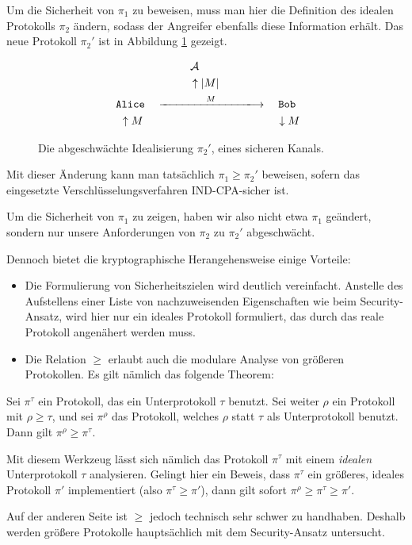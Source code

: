 Um die Sicherheit von $\pi_1$ zu beweisen, muss man hier die Definition des idealen Protokolls $\pi_2$ ändern, sodass der Angreifer ebenfalls diese Information erhält. Das neue Protokoll $\pi_2'$ ist in Abbildung \ref{fig:protocols:weaksecurechannel} gezeigt.

\begin{figure}[hbtp]
	\begin{gather*}
		\advA\quad\quad\\
		\uparrow|M|\\
		\texttt{Alice}\quad
		\xlongrightarrow{\qquad\qquad M\qquad\qquad}
		\quad\texttt{Bob}\\
		\quad\uparrow M\qquad\qquad\qquad\qquad\qquad\qquad\downarrow M
    \end{gather*}
    \caption{Die abgeschwächte Idealisierung $\pi_2'$, eines sicheren Kanals.}
    \label{fig:protocols:weaksecurechannel}
\end{figure}

Mit dieser Änderung kann man tatsächlich $\pi_1 \geq \pi_2'$ beweisen, sofern das eingesetzte Verschlüsselungsverfahren IND-CPA-sicher ist.

Um die Sicherheit von $\pi_1$ zu zeigen, haben wir also nicht etwa $\pi_1$ geändert, sondern nur unsere Anforderungen von $\pi_2$ zu $\pi_2'$ abgeschwächt.

Dennoch bietet die kryptographische Herangehensweise einige Vorteile:
\begin{itemize}
	\item Die Formulierung von Sicherheitszielen wird deutlich vereinfacht.
	Anstelle des Aufstellens einer Liste von nachzuweisenden Eigenschaften wie beim Security-Ansatz, wird hier nur ein ideales Protokoll formuliert, das durch das reale Protokoll angenähert werden muss.
	\item Die Relation $\geq$ erlaubt auch die modulare Analyse von größeren Protokollen.
	Es gilt nämlich das folgende Theorem:
\end{itemize}

\begin{theorem}
    Sei \(\pi^{\tau}\) ein Protokoll, das ein Unterprotokoll \(\tau\)
    benutzt. Sei weiter \(\rho\) ein Protokoll mit \(\rho\geq\tau\), und sei
    \(\pi^{\rho}\) das Protokoll, welches \(\rho\) statt \(\tau\) als
    Unterprotokoll benutzt. Dann gilt \(\pi^{\rho}\geq\pi^{\tau}\).
\end{theorem}

Mit diesem Werkzeug lässt sich nämlich das Protokoll $\pi^\tau$ mit einem \emph{idealen} Unterprotokoll $\tau$ analysieren. Gelingt hier ein Beweis, dass $\pi^\tau$ ein größeres, ideales Protokoll $\pi'$ implementiert (also $\pi^\tau \geq \pi'$), dann gilt sofort $\pi^\rho \geq \pi^\tau \geq \pi'$.

Auf der anderen Seite ist $\geq$ jedoch technisch sehr schwer zu handhaben. Deshalb werden größere Protokolle hauptsächlich mit dem Security-Ansatz untersucht.


